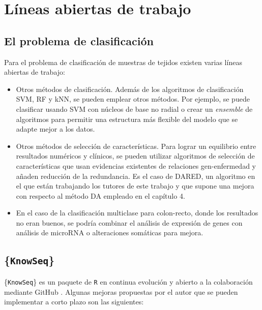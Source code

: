 \chapter{Líneas abiertas de trabajo}

\section{El problema de clasificación}

Para el problema de clasificación de muestras de tejidos existen varias líneas abiertas de trabajo:

\begin{itemize}
	\item Otros métodos de clasificación. Además de los algoritmos de clasificación SVM, RF y kNN, se pueden emplear otros métodos. Por ejemplo, se puede clasificar usando SVM con núcleos de base no radial o crear un \textit{ensemble} de algoritmos para permitir una estructura más flexible del modelo que se adapte mejor a los datos.
	\item Otros métodos de selección de características. Para lograr un equilibrio entre resultados numéricos y clínicos, se pueden utilizar algoritmos de selección de características que usan evidencias existentes de relaciones gen-enfermedad y añaden reducción de la redundancia. Es el caso de DARED, un algoritmo en el que están trabajando los tutores de este trabajo y que supone una mejora con respecto al método DA empleado en el capítulo 4.
	\item En el caso de la clasificación multiclase para colon-recto, donde los resultados no eran buenos, se podría combinar el análisis de expresión de genes con análisis de microRNA o alteraciones somáticas para mejora.
\end{itemize}

\section{\{\texttt{KnowSeq}\}}

\{\texttt{KnowSeq}\} es un paquete de \texttt{R} en continua evolución y abierto a la colaboración mediante GitHub \cite{KnowSeq}. Algunas mejoras propuestas por el autor que se pueden implementar a corto plazo son las siguientes:

